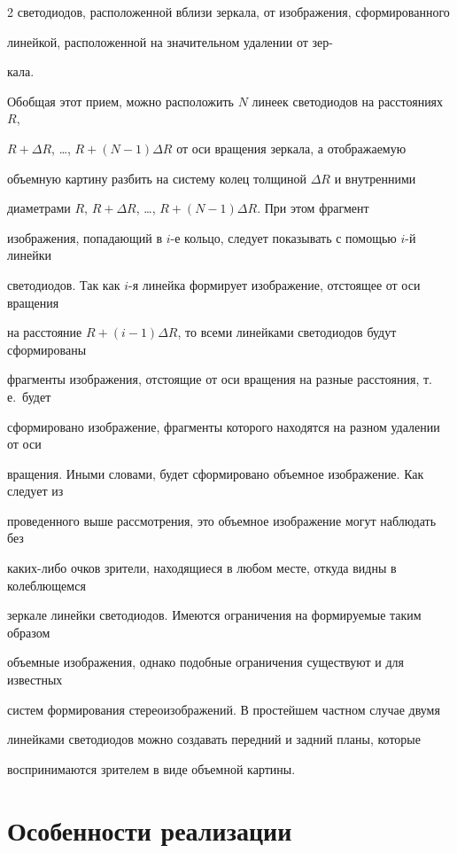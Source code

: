 \begin{multicols}{2}
светодиодов, расположенной вблизи зеркала, от изображения, сформированного 

линейкой, расположенной на значительном удалении от зер-\linebreak

кала. 





  Обобщая этот прием, можно расположить $N$ линеек светодиодов на расстояниях $R$, 

$R + \Delta R$, \ldots , $R + (N-1)\Delta R$ от оси вращения зеркала, а отоб\-ра\-жа\-емую 

объемную картину разбить на систему колец толщиной $\Delta R$ и внутренними 

диаметрами $R$, $R + \Delta R$, \ldots , $R + (N-1)\Delta R$. При этом фрагмент 

изображения, попадающий в $i$-е кольцо, следует показывать с помощью $i$-й линейки 

светодиодов. Так как $i$-я линейка формирует изображение, отстоящее от оси вращения 

на расстояние $R + (i-1)\Delta R$, то всеми линейками светодиодов будут сформированы 

фрагменты изображения, отстоящие от оси вращения на разные расстояния, т.\,е.\ будет 

сформировано изображение, фрагменты которого находятся на разном удалении от оси 

вращения. Иными словами, будет сформировано объемное изображение. Как следует из 

проведенного выше рас\-смот\-ре\-ния, это объемное изображение могут наблюдать без 

  каких-либо очков зрители, находящиеся в любом месте, откуда видны в колеблющемся 

зеркале линейки светодиодов. Имеются ограничения на формируемые таким образом 

объемные изображения, однако подобные ограничения существуют и для известных 

систем формирования стереоизображений. В простейшем частном случае двумя 

линейками светодиодов можно создавать передний и задний планы, которые 

воспринимаются зрителем в виде объемной картины. 



\section{Особенности реализации}




\end{multicols}
